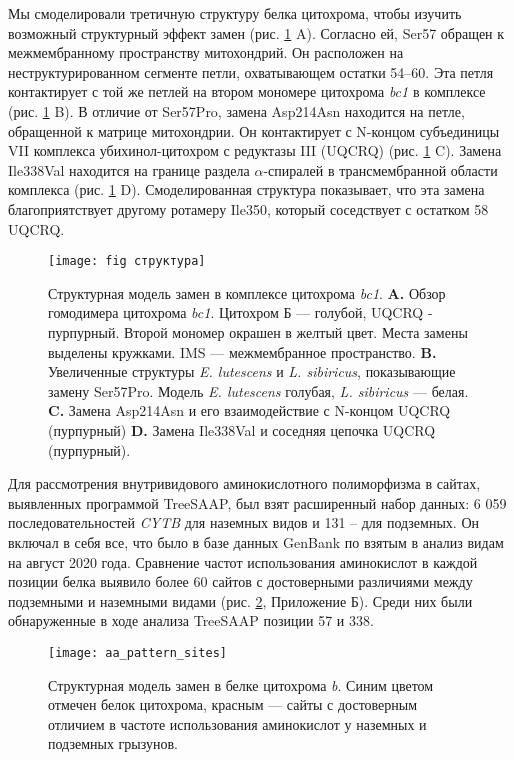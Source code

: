 Мы смоделировали третичную структуру белка цитохрома, чтобы изучить возможный структурный эффект замен (рис. \ref{CytStructure} A). Согласно ей, Ser57 обращен к межмембранному пространству митохондрий. Он расположен на неструктурированном сегменте петли, охватывающем остатки 54–60. Эта петля контактирует с той же петлей на втором мономере цитохрома \textit{bc1} в комплексе (рис. \ref{CytStructure} B). В отличие от Ser57Pro, замена Asp214Asn находится на петле, обращенной к матрице митохондрии. Он контактирует с N-концом субъединицы VII комплекса убихинол-цитохром с редуктазы III (UQCRQ) (рис. \ref{CytStructure} C). Замена Ile338Val находится на границе раздела $\alpha$-спиралей в трансмембранной области комплекса (рис. \ref{CytStructure} D). Смоделированная структура показывает, что эта замена благоприятствует другому ротамеру Ile350, который соседствует с остатком 58 UQCRQ.

\begin{figure}[h!]
	\begin{center}
		\texttt{[image: fig структура]}
	\end{center}
	\caption{Структурная модель замен в комплексе цитохрома \textit{bc1}. \textbf{A.} Обзор гомодимера цитохрома \textit{bc1}. Цитохром Б --- голубой, UQCRQ - пурпурный. Второй мономер окрашен в желтый цвет. Места замены выделены кружками. IMS --- межмембранное пространство. \textbf{B.} Увеличенные структуры \textit{E. lutescens} и \textit{L. sibiricus}, показывающие замену Ser57Pro. Модель \textit{E. lutescens} голубая, \textit{L. sibiricus} --- белая. \textbf{C.} Замена Asp214Asn и его взаимодействие с N-концом UQCRQ (пурпурный) \textbf{D.} Замена Ile338Val и соседняя цепочка UQCRQ (пурпурный).}
	\label{CytStructure}
\end{figure}

Для рассмотрения внутривидового аминокислотного полиморфизма в сайтах, выявленных программой TreeSAAP, был взят расширенный набор данных: 6 059 последовательностей \textit{CYTB} для наземных видов и 131 -- для подземных. Он включал в себя все, что было в базе данных GenBank по взятым в анализ видам на август 2020 года. Сравнение частот использования аминокислот в каждой позиции белка выявило более 60 сайтов с достоверными различиями между подземными и наземными видами (рис. \ref{Aa_sybst_structure}, Приложение Б). Среди них были обнаруженные в ходе анализа TreeSAAP позиции 57 и 338.

\begin{figure}[h!]
	\begin{center}
		\texttt{[image: aa\_pattern\_sites]}
	\end{center}
	\caption{Структурная модель замен в белке цитохрома \textit{b}. Синим цветом отмечен белок цитохрома, красным --- сайты с достоверным отличием в частоте использования аминокислот у наземных и подземных грызунов.}
	\label{Aa_sybst_structure}
\end{figure}

